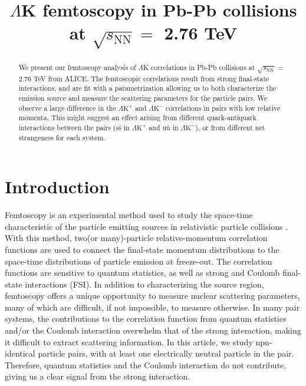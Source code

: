 \documentclass[ALICE,manyauthors]{cernphprep}
\newcommand{\LamK}{$\Lambda$K\xspace}
\newcommand{\LamKchP}{$\Lambda\mathrm{K^{+}}$\xspace}
\newcommand{\LamKchM}{$\Lambda\mathrm{K^{-}}$\xspace}
\begin{document}
%

\begin{titlepage}
%
%

\title{\LamK femtoscopy in Pb-Pb collisions at $\sqrt{s_{\mathrm{NN}}} = $ 2.76 TeV}
\ShortTitle{\LamK femtoscopy in Pb-Pb collisions}   %


\begin{abstract}
We present our femtoscopy analysis of \LamK correlations in Pb-Pb collisions at $\sqrt{s_{\mathrm{NN}}}$ = 2.76 TeV from ALICE.  
The femtoscopic correlations result from strong final-state interactions, and are fit with a parametrization allowing us to both characterize the emission source and measure the scattering parameters for the particle pairs.  
We observe a large difference in the \LamKchP and \LamKchM correlations in pairs with low relative momenta.  
This might suggest an effect arising from different quark-antiquark interactions between the pairs ($\mathrm{s}\bar{\mathrm{s}}$ in \LamKchP and $\mathrm{u}\bar{\mathrm{u}}$ in \LamKchM), or from different net strangeness for each system.
\end{abstract}
\end{titlepage}
\setcounter{page}{2}

\section{Introduction}
\label{sec:Introduction}

Femtoscopy is an experimental method used to study the space-time characteristic of the particle emitting sources in relativistic particle collisions \cite{Lisa:2005dd}.  With this method, two(or many)-particle relative-momentum correlation functions are used to connect the final-state momentum distributions to the space-time distributions of particle emission at freeze-out.  The correlation functions are sensitive to quantum statistics, as well as strong and Coulomb final-state interactions (FSI).  In addition to characterizing the source region, femtoscopy offers a unique opportunity to measure nuclear scattering parameters, many of which are difficult, if not impossible, to measure otherwise.  In many pair systems, the contributions to the correlation function from quantum statistics and/or the Coulomb interaction overwhelm that of the strong interaction, making it difficult to extract scattering information.  In this article, we study npn-identical particle pairs, with at least one electrically neutral particle in the pair.  Therefore, quantum statistics and the Coulomb interaction do not contribute, giving us a clear signal from the strong interaction.
\end{document}
